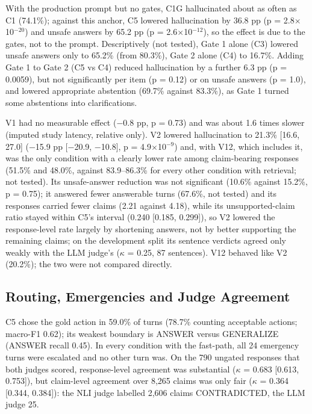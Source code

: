 \documentclass[conference]{IEEEtran}
\begin{document}
With the production prompt but no gates, C1G hallucinated about as often as C1 (74.1\%); against this anchor, C5 lowered hallucination by 36.8 pp (p = 2.8$\times$10$^{-20}$) and unsafe answers by 65.2 pp (p = 2.6$\times$10$^{-12}$), so the effect is due to the gates, not to the prompt. Descriptively (not tested), Gate 1 alone (C3) lowered unsafe answers only to 65.2\% (from 80.3\%), Gate 2 alone (C4) to 16.7\%. Adding Gate 1 to Gate 2 (C5 vs C4) reduced hallucination by a further 6.3 pp (p = 0.0059), but not significantly per item (p = 0.12) or on unsafe answers (p = 1.0), and lowered appropriate abstention (69.7\% against 83.3\%), as Gate 1 turned some abstentions into clarifications.

V1 had no measurable effect ($-$0.8 pp, p = 0.73) and was about 1.6 times slower (imputed study latency, relative only). V2 lowered hallucination to 21.3\% [16.6, 27.0] ($-$15.9 pp [$-$20.9, $-$10.8], p = 4.9$\times$10$^{-9}$) and, with V12, which includes it, was the only condition with a clearly lower rate among claim-bearing responses (51.5\% and 48.0\%, against 83.9--86.3\% for every other condition with retrieval; not tested). Its unsafe-answer reduction was not significant (10.6\% against 15.2\%, p = 0.75); it answered fewer answerable turns (67.6\%, not tested) and its responses carried fewer claims (2.21 against 4.18), while its unsupported-claim ratio stayed within C5's interval (0.240 [0.185, 0.299]), so V2 lowered the response-level rate largely by shortening answers, not by better supporting the remaining claims; on the development split its sentence verdicts agreed only weakly with the LLM judge's ($\kappa$ = 0.25, 87 sentences). V12 behaved like V2 (20.2\%); the two were not compared directly.

\subsection{Routing, Emergencies and Judge Agreement}

C5 chose the gold action in 59.0\% of turns (78.7\% counting acceptable actions; macro-F1 0.62); its weakest boundary is ANSWER versus GENERALIZE (ANSWER recall 0.45). In every condition with the fast-path, all 24 emergency turns were escalated and no other turn was. On the 790 ungated responses that both judges scored, response-level agreement was substantial ($\kappa$ = 0.683 [0.613, 0.753]), but claim-level agreement over 8,265 claims was only fair ($\kappa$ = 0.364 [0.344, 0.384]): the NLI judge labelled 2,606 claims CONTRADICTED, the LLM judge 25.
\end{document}
